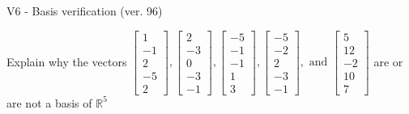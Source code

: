 \begin{exercise}
  \begin{exerciseTitle}V6 - Basis verification (ver. 96)\end{exerciseTitle}
  \begin{exerciseStatement}
    Explain why the vectors \(\left[\begin{array}{r}
1 \\
-1 \\
2 \\
-5 \\
2
\end{array}\right] , \left[\begin{array}{r}
2 \\
-3 \\
0 \\
-3 \\
-1
\end{array}\right] , \left[\begin{array}{r}
-5 \\
-1 \\
-1 \\
1 \\
3
\end{array}\right] , \left[\begin{array}{r}
-5 \\
-2 \\
2 \\
-3 \\
-1
\end{array}\right] , \text{ and } \left[\begin{array}{r}
5 \\
12 \\
-2 \\
10 \\
7
\end{array}\right]\) are or are not a basis of \(\mathbb{R}^5\)	



\end{exerciseStatement}
\end{exercise}
